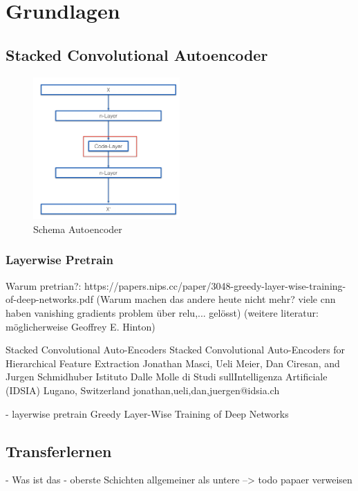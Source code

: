 \chapter{Grundlagen}
\label{chap:Grundlagen}

	\section{Stacked Convolutional Autoencoder }
	\label{sec:StackedConvolutionalAutoencoder}		
	
			\begin{figure}[h]
				\centering
				\includegraphics[width=0.5\textwidth, center]{bilder/Schema_Autoencoders/Schema_CAE.png}
				\caption[Schema Autoencoder]{Schema Autoencoder}
				\label{img:SchemaCAE}
			\end{figure}  

		\subsection{Layerwise Pretrain }

		Warum pretrian?:	https://papers.nips.cc/paper/3048-greedy-layer-wise-training-of-deep-networks.pdf (Warum machen das andere heute nicht mehr? viele cnn haben vanishing gradients problem  über relu,... gelösst) (weitere literatur: möglicherweise Geoffrey E. Hinton)

		Stacked Convolutional Auto-Encoders Stacked Convolutional Auto-Encoders for
		Hierarchical Feature Extraction
		Jonathan Masci, Ueli Meier, Dan Ciresan, and Jurgen Schmidhuber
		Istituto Dalle Molle di Studi sullIntelligenza Artificiale (IDSIA)
		Lugano, Switzerland
		{jonathan,ueli,dan,juergen}@idsia.ch
		
		- layerwise pretrain {Greedy Layer-Wise Training of Deep Networks}

	\section{ Transferlernen}
	\label{sec:Transferlernen}
		- Was ist das
		-	oberste Schichten allgemeiner als untere --> todo papaer verweisen

